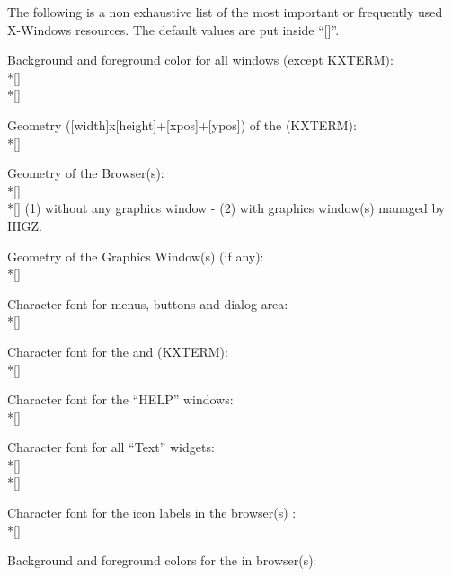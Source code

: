 The following is a non exhaustive list of the most important or frequently 
used X-Windows resources. The default values are put inside ``[]''.
\begin{UL}
\item
Background and foreground color for all windows (except KXTERM):
\\*[\smallskipamount]\texttt{}
\\*[\smallskipamount]\texttt{}
\item
Geometry ([width]x[height]+[xpos]+[ypos]) of the \EW{} (KXTERM):
\\*[\smallskipamount]\texttt{}
\item
Geometry of the Browser(s):
\\*[\smallskipamount]\texttt{}\\*[\smallskipamount]
(1) without any graphics window - (2) with graphics window(s) managed by HIGZ.
\item
Geometry of the Graphics Window(s) (if any):
\\*[\smallskipamount]\texttt{}
\item
Character font for menus, buttons and dialog area:
\\*[\smallskipamount]\texttt{}
\item
Character font for the \INP{} and \TP{} (KXTERM):
\\*[\smallskipamount]\texttt{}
\item
Character font for the ``HELP'' windows:
\\*[\smallskipamount]\texttt{}
\item
Character font for all ``Text'' widgets:
\\*[\smallskipamount]\texttt{}
\\*[\smallskipamount]\texttt{}
\item
Character font for the icon labels in the browser(s) \OW{}:
\\*[\smallskipamount]\texttt{}
\item
Background and foreground colors for the \OW{} in browser(s):

\end{UL}
